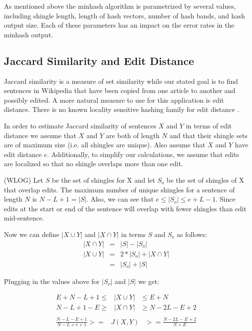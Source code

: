 \documentclass{acm_proc_article-sp}
\begin{document}
As mentioned above the minhash algorithm is parametrized by several values, including shingle length, length of hash vectors, number of hash bands, and hash output size. Each of these parameters has an impact on the error rates in the minhash output. 

\subsection{Jaccard Similarity and Edit Distance}

Jaccard similarity is a measure of set similarity while our stated goal is to find sentences in Wikipedia that have been copied from one article to another and possibly edited. A more natural measure to use for this application is edit distance. There is no known locality sensitive hashing family for edit distance \citation{}.

In order to estimate Jaccard similarity of sentences $X$ and $Y$ in terms of edit distance we assume that $X$ and $Y$ are both of length $N$ and that their shingle sets are of maximum size (i.e. all shingles are unique). Also assume that $X$ and $Y$ have edit distance $e$.  Additionally, to simplify our calculations, we assume that edits are localized so that no shingle overlaps more than one edit.

(WLOG) Let $S$ be the set of shingles for X and let $S_o$ be the set of shingles of X that overlap edits. The maximum number of unique shingles for a sentence of length $N$ is $N - L + 1 = |S|$. Also, we can see that $e \le |S_o| \le e + L - 1$. Since edits at the start or end of the sentence will overlap with fewer shingles than edit mid-sentence.

Now we can define $|X \cup Y|$ and $|X \cap Y|$ in terms $S$ and $S_o$ as follows:
\begin{eqnarray*}
|X \cap Y| & = & |S| - |S_o| \\
|X \cup Y| & = & 2*|S_o| + |X \cap Y| \\
           & = & |S_o| + |S|
\end{eqnarray*}

Plugging in the values above for $|S_o|$ and $|S|$ we get:

\begin{eqnarray*}
E + N - L + 1  \le & |X \cup Y| & \le E + N \\
N - L + 1 - E  \ge & |X \cap Y| & \ge N - 2L - E + 2 \\
\end{eqnarray*}
\begin{eqnarray*}
\frac{N - L - E + 1 }{N - L + e + 1} >= & J(X,Y) & >= \frac{N - 2L - E + 2}{N + E}
\end{eqnarray*}
\end{document}
